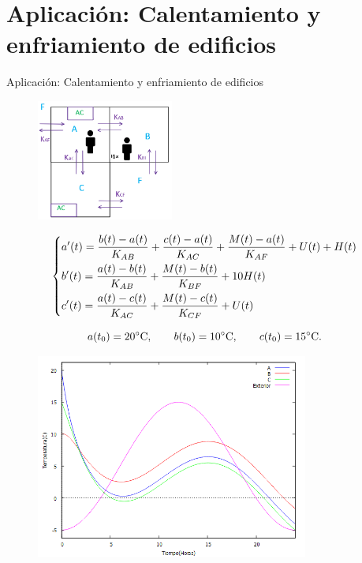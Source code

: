 \documentclass{beamer}
\begin{document}
\section{Aplicación: Calentamiento y enfriamiento de edificios}
\begin{frame}{Aplicación: Calentamiento y enfriamiento de edificios}
\begin{figure}[h!]
	\centering
	\includegraphics[width=0.4\textwidth]{edificio_3habs}
\end{figure}
\begin{equation}\begin{dcases}
		a'(t)= \dfrac{b(t)-a(t)}{K_{AB}} + \dfrac{c(t)-a(t)}{K_{AC}} + \dfrac{M(t) - a(t)}{K_{AF}} + U(t) + H(t) \\  b'(t)= \dfrac{a(t)-b(t)}{K_{AB}} + \dfrac{M(t) - b(t)}{K_{BF}} + 10H(t) \\ c'(t)= \dfrac{a(t)-c(t)}{K_{AC}} + \dfrac{M(t) - c(t)}{K_{CF}} + U(t) \end{dcases}
\end{equation}
\end{frame}
\begin{frame}
	\begin{equation*}
		a(t_0) = 20 \celsius, \qquad b(t_0) = 10 \celsius, \qquad c(t_0) = 15 \celsius.
	\end{equation*}
	\begin{figure}[h!]
		\centering
		\includegraphics[width=0.8\textwidth]{graf_sol3}
	\end{figure}
\end{frame}
\end{document}
